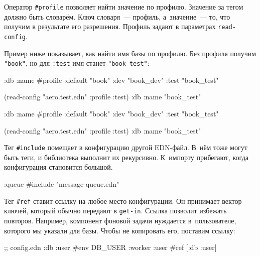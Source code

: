 
Оператор \verb|#profile| позволяет найти значение по профилю. Значение за тегом
должно быть словарём. Ключ словаря~--- профиль, а~значение~--- то, что получим в
результате его разрешения. Профиль задают в параметрах \verb|read-config|.

Пример ниже показывает, как найти имя базы по профилю. Без профиля получим
\verb|"book"|, но для \verb|:test| имя станет \verb|"book_test"|:

\pagebreakafive

\ifnarrow

\begin{english}
  \begin{clojure}
{:db
 {:name
  #profile {:default "book"
            :dev     "book_dev"
            :test    "book_test"}}}

(read-config "aero.test.edn"
  {:profile :test})
{:db {:name "book_test"}}
  \end{clojure}
\end{english}

\else

\begin{english}
  \begin{clojure}
{:db {:name #profile {:default "book"
                      :dev     "book_dev"
                      :test    "book_test"}}}

(read-config "aero.test.edn" {:profile :test})
{:db {:name "book_test"}}
  \end{clojure}
\end{english}

\fi

Тег \verb|#include| помещает в конфигурацию другой EDN-файл. В~нём тоже могут
быть теги, и библиотека выполнит их рекурсивно. К~импорту прибегают, когда
конфигурация становится большой.

\begin{english}
  \begin{clojure}
{:queue #include "message-queue.edn"}
  \end{clojure}
\end{english}

Тег \verb|#ref| ставит ссылку на любое место конфигурации. Он принимает вектор
ключей, который обычно передают в \verb|get-in|. Ссылка позволит избежать
повторов.  Например, компонент фоновой задачи нуждается в~пользователе, которого
мы указали для базы. Чтобы не копировать его, поставим ссылку:

\begin{english}
  \begin{clojure}
;; config.edn
{:db {:user #env DB_USER}
 :worker {:user #ref [:db :user]}}
  \end{clojure}
\end{english}

